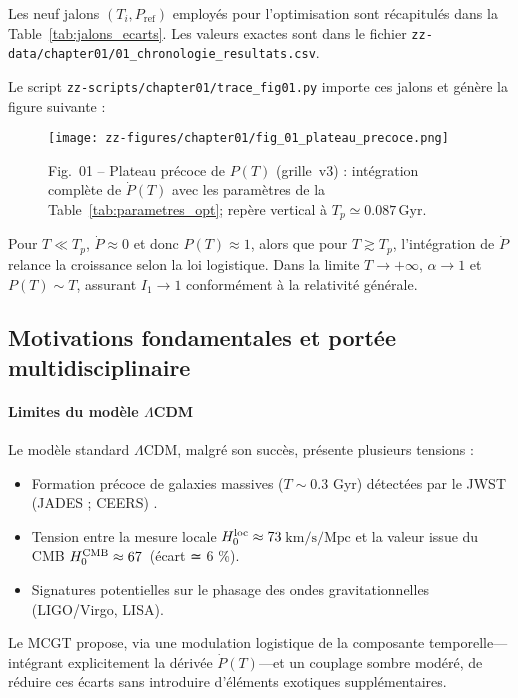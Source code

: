 Les neuf jalons \((T_i,P_{\mathrm{ref}})\) employés pour l’optimisation sont récapitulés dans la Table~\ref{tab:jalons_ecarts}.  
Les valeurs exactes sont dans le fichier  
\texttt{zz-data/chapter01/01\_chronologie\_resultats.csv}.  

Le script \texttt{zz-scripts/chapter01/trace\_fig01.py} importe ces jalons  
et génère la figure suivante :

\begin{figure}[htbp]
  \centering
  \texttt{[image: zz-figures/chapter01/fig\_01\_plateau\_precoce.png]}
  \caption{Fig.~01 – Plateau précoce de \(P(T)\) (grille~v3) :  
           intégration complète de \(\dot P(T)\) avec les paramètres de la Table~\ref{tab:parametres_opt};  
           repère vertical à \(T_{p}\simeq0.087\,\mathrm{Gyr}\).}
  \label{fig:plateau_precoce}
\end{figure}

Pour \(T\ll T_{p}\), \(\dot P\approx0\) et donc \(P(T)\approx1\),  
alors que pour \(T\gtrsim T_{p}\), l’intégration de \(\dot P\) relance la croissance selon la loi logistique.  
Dans la limite \(T\to+\infty\), \(\alpha\to1\) et \(P(T)\sim T\), assurant \(I_{1}\to1\) conformément à la relativité générale.  

\subsection{Motivations fondamentales et portée multidisciplinaire}

\paragraph{Limites du modèle \(\Lambda\)CDM}  
Le modèle standard \(\Lambda\)CDM, malgré son succès, présente plusieurs tensions :
\begin{itemize}
  \item Formation précoce de galaxies massives (\(T\sim0.3\) Gyr) détectées par le JWST (JADES ; CEERS) \cite{JWST:JADES,JWST:CEERS}.
  \item Tension entre la mesure locale \(H_{0}^{\rm loc}\approx73\)\,\(\mathrm{km/s/Mpc}\) et la valeur issue du CMB \(H_{0}^{\rm CMB}\approx67\)\, (écart ≃ 6 \%).
  \item Signatures potentielles sur le phasage des ondes gravitationnelles (LIGO/Virgo, LISA).
\end{itemize}
Le MCGT propose, via une modulation logistique de la composante temporelle—intégrant explicitement la dérivée \(\dot P(T)\)—et un couplage sombre modéré, de réduire ces écarts sans introduire d’éléments exotiques supplémentaires.

